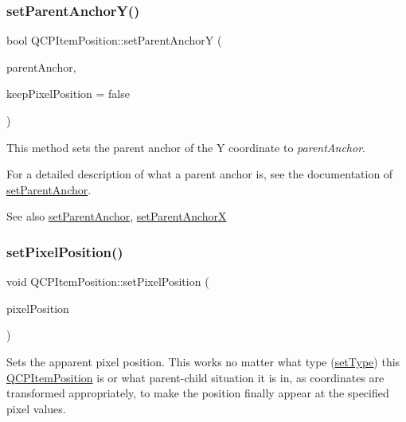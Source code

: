 \subsubsection{\texorpdfstring{setParentAnchorY()}{setParentAnchorY()}}
{\footnotesize\ttfamily bool Q\+C\+P\+Item\+Position\+::set\+Parent\+AnchorY (\begin{DoxyParamCaption}\item[{\mbox{\hyperlink{class_q_c_p_item_anchor}{Q\+C\+P\+Item\+Anchor}} $\ast$}]{parent\+Anchor,  }\item[{bool}]{keep\+Pixel\+Position = {\ttfamily false} }\end{DoxyParamCaption})}

This method sets the parent anchor of the Y coordinate to {\itshape parent\+Anchor}.

For a detailed description of what a parent anchor is, see the documentation of \mbox{\hyperlink{class_q_c_p_item_position_ac094d67a95d2dceafa0d50b9db3a7e51}{set\+Parent\+Anchor}}.

\begin{DoxySeeAlso}{See also}
\mbox{\hyperlink{class_q_c_p_item_position_ac094d67a95d2dceafa0d50b9db3a7e51}{set\+Parent\+Anchor}}, \mbox{\hyperlink{class_q_c_p_item_position_add71461a973927c74e42179480916d9c}{set\+Parent\+AnchorX}} 
\end{DoxySeeAlso}
\mbox{\label{class_q_c_p_item_position_a8d4f858f2089973967cf9cb81970ef0a}} 
\subsubsection{\texorpdfstring{setPixelPosition()}{setPixelPosition()}}
{\footnotesize\ttfamily void Q\+C\+P\+Item\+Position\+::set\+Pixel\+Position (\begin{DoxyParamCaption}\item[{const Q\+PointF \&}]{pixel\+Position }\end{DoxyParamCaption})}

Sets the apparent pixel position. This works no matter what type (\mbox{\hyperlink{class_q_c_p_item_position_aa476abf71ed8fa4c537457ebb1a754ad}{set\+Type}}) this \mbox{\hyperlink{class_q_c_p_item_position}{Q\+C\+P\+Item\+Position}} is or what parent-\/child situation it is in, as coordinates are transformed appropriately, to make the position finally appear at the specified pixel values.

